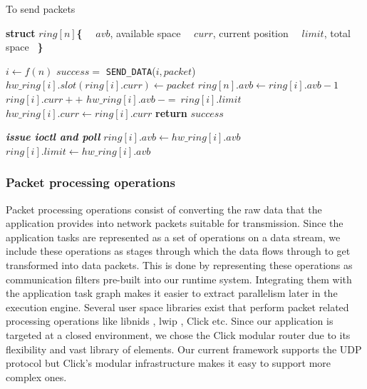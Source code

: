\documentclass[10pt, conference, compsocconf, reqno]{IEEEtran}
\newcommand{\comment}[1]{}
\begin{document}
\setlength{\textfloatsep}{0pt}


\begin{algorithm}[h]
\caption{To send packets}
\label{s_pack}
\begin{algorithmic}[1]

\State \textbf{struct} $ring[ n ]$\textbf{\{}
\State {}
\State {}
\State \  \  $avb$, available space
\State \  \  $curr$, current position
\State \  \  $limit$, total space \ \textbf{\}}

	\State $i \gets f( n ) $ \label{s_pack_param}
	\State $success = $ \texttt{SEND\_DATA}($ i, packet $)
\EndWhile
\EndFunction
{}
	\State $hw\_ring[ i ].slot( ring[ i ].curr ) \gets packet$
	\State $ring[ n ].avb \gets ring[ i ].avb - 1$
	\State $ring[ i ].curr++$
		\State $hw\_ring[ i ].avb \ -=\ ring[ i ].limit$
		\State $hw\_ring[ i ].curr \gets ring[ i ].curr$
	\EndIf
	\State \textbf{return} $success$
\EndIf

\State \textbf{\textit{issue ioctl and poll}}
\State $ring[ i ].avb \gets hw\_ring[ i ].avb$
\State $ring[ i ].limit \gets hw\_ring[ i ].avb$
\EndFunction

\end{algorithmic}
\end{algorithm}

\subsubsection{Packet processing operations}

Packet processing operations consist of converting the raw data that the application provides into network packets suitable for transmission. Since the application tasks are represented as a set of operations on a data stream, we include these operations as stages through which the data flows through to get transformed into data packets. This is done by representing these operations as communication filters pre-built into our runtime system. Integrating them with the application task graph makes it easier to extract parallelism later in the execution engine. Several user space libraries exist that perform packet related processing operations like libnids \cite{libnids}, lwip \cite{Dunkels01designand}, Click \cite{Kohler2000} etc. Since our application is targeted at a closed environment, we chose the Click modular router due to its flexibility and vast library of elements. Our current framework supports the UDP protocol but Click's modular infrastructure makes it easy to support more complex ones. \comment{Indeed, stream applications with more complex protocols would benefit even more from the framework due to the parallelizing of these complex tasks.}
\end{document}
